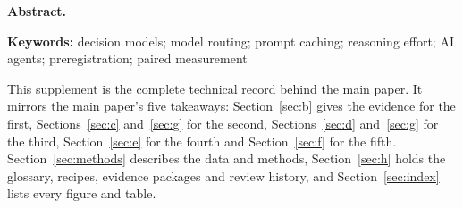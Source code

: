 \begin{center}\begin{minipage}{0.93\textwidth}\small
\noindent\textbf{Abstract.} 
\par\smallskip\noindent\textbf{Keywords:} decision models; model routing; prompt caching; reasoning effort; AI agents;
preregistration; paired measurement
\par\smallskip\noindent This supplement is the complete technical record behind the main paper. It mirrors the main
paper's five takeaways: Section~\ref{sec:b} gives the evidence for the first, Sections~\ref{sec:c} and~\ref{sec:g} for
the second, Sections~\ref{sec:d} and~\ref{sec:g} for the third, Section~\ref{sec:e} for the fourth and
Section~\ref{sec:f} for the fifth. Section~\ref{sec:methods} describes the data and methods, Section~\ref{sec:h} holds
the glossary, recipes, evidence packages and review history, and Section~\ref{sec:index} lists every figure and table.
\end{minipage}\end{center}
